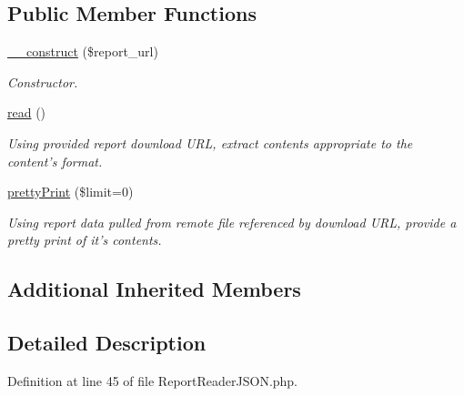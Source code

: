 \subsection*{Public Member Functions}
\begin{DoxyCompactItemize}
\item 
\hyperlink{classTune_1_1Management_1_1Reports_1_1ReportReaderJSON_a8d6da48e523415c0b9ae6ef2d2d8df01}{\-\_\-\-\_\-construct} (\$report\-\_\-url)
\begin{DoxyCompactList}\small\item\em Constructor. \end{DoxyCompactList}\item 
\hyperlink{classTune_1_1Management_1_1Reports_1_1ReportReaderJSON_a2ce2eb7e18962638877a96c06ebed908}{read} ()
\begin{DoxyCompactList}\small\item\em Using provided report download U\-R\-L, extract contents appropriate to the content's format. \end{DoxyCompactList}\item 
\hyperlink{classTune_1_1Management_1_1Reports_1_1ReportReaderJSON_a139f36223334e99aa1e0b55184681741}{pretty\-Print} (\$limit=0)
\begin{DoxyCompactList}\small\item\em Using report data pulled from remote file referenced by download U\-R\-L, provide a pretty print of it's contents. \end{DoxyCompactList}\end{DoxyCompactItemize}
\subsection*{Additional Inherited Members}


\subsection{Detailed Description}


Definition at line 45 of file Report\-Reader\-J\-S\-O\-N.\-php.



